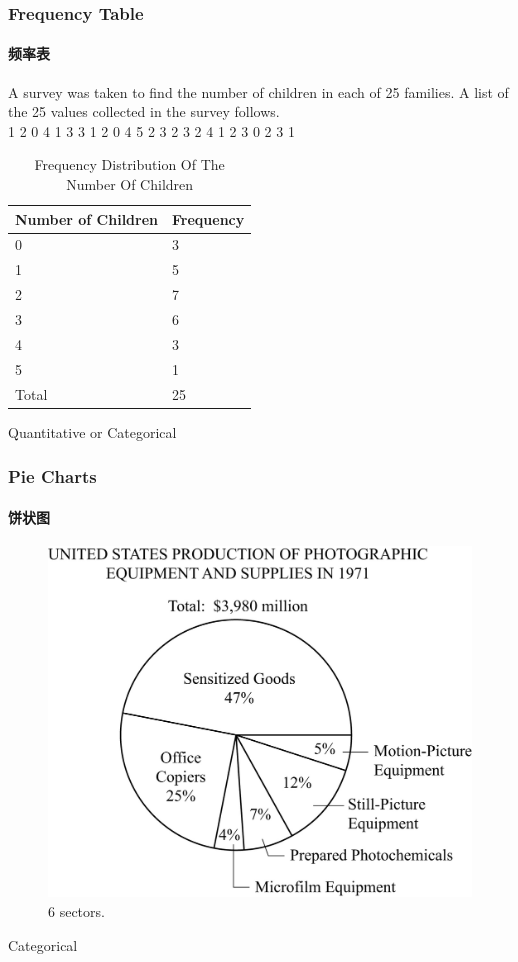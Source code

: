 \documentclass[
	11pt, %
]{beamer}
\begin{document}
\begin{frame}
	\frametitle{Frequency Table}
	\framesubtitle{频率表} %
	A survey was taken to find the number of children in each
of 25 families. A list of the 25 values collected in the survey follows.\\
1 2 0 4 1 3 3 1 2 0 4 5 2 3 2 3 2 4 1 2 3 0 2 3 1
	\begin{table}
		\begin{tabular}{l l }
			\toprule
			\textbf{Number of Children} & \textbf{Frequency}\\
			\midrule
			0 & 3 \\
			1 & 5 \\
			2 & 7 \\
			3 & 6 \\
			4 & 3 \\
			5 & 1 \\
			Total & 25\\
			\bottomrule
		\end{tabular}
		\caption{Frequency Distribution Of The Number Of Children}
	\end{table}
	\alert{Quantitative or Categorical}
\end{frame}


\begin{frame}
	\frametitle{Pie Charts}
	\framesubtitle{饼状图} %

	\begin{figure}
		\includegraphics[width=0.5\linewidth]{Pie_Charts.jpg}
		\caption{6 sectors.}
	\end{figure}
	\alert{Categorical}
\end{frame}

\end{document}
